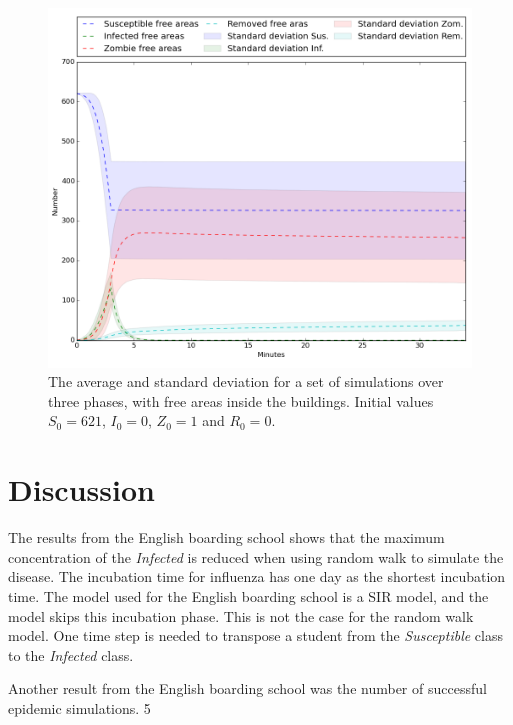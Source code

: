 \documentclass[%
twoside,                 %
final,                   %
chapterprefix=true,      %
open=right               %
10pt]{book}
\begin{document}
\begin{figure}[ht]
  \centerline{\includegraphics[width=0.8\linewidth]{3_fig/three_phases_free.png}}
  \caption{
  \label{fig:three_phases_free} The average and standard deviation for a set of simulations over three phases, with free areas inside the buildings. Initial values $S_0 = 621$, $I_0 = 0$, $Z_0=1$ and $R_0=0$.
  }
\end{figure}






\section{Discussion}
The results from the English boarding school shows that the maximum concentration of the \emph{Infected} is reduced when using random walk to simulate the disease. The incubation time for influenza has one day as the shortest incubation time. The model used for the English boarding school is a SIR model, and the model skips this incubation phase. This is not the case for the random walk model. One time step is needed to transpose a student from the \emph{Susceptible} class to the \emph{Infected} class. 


\vspace{3mm}




\vspace{3mm}


Another result from the English boarding school was the number of successful epidemic simulations. 5 %
\end{document}
